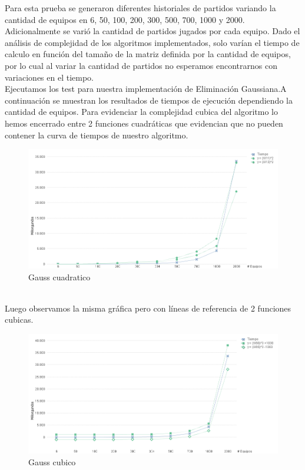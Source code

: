 Para esta prueba se generaron diferentes historiales de partidos variando la cantidad de equipos en 6, 50, 100, 200, 300, 500, 700, 1000 y 2000. \\

Adicionalmente se varió la cantidad de partidos jugados por cada equipo. Dado el análisis de complejidad de los algoritmos implementados, solo varían el tiempo de calculo en
función del tamaño de la matriz definida por la cantidad de equipos, por lo cual al variar la cantidad de partidos no esperamos encontrarnos con variaciones en el tiempo. \\

Ejecutamos los test para nuestra implementación de Eliminación Gaussiana.A continuación se muestran los resultados de tiempos de ejecución dependiendo la cantidad de equipos.
Para evidenciar la complejidad cubica del algoritmo lo hemos encerrado entre 2 funciones cuadráticas que evidencian que no pueden contener la curva de tiempos de nuestro algoritmo. \\

\begin{figure}[H]
    \centering
    \includegraphics[width=1\textwidth]{IMG/gauss cuadrativo.png}
    \caption{Gauss cuadratico}
    \label{fig:Gauss cuadratico}
\end{figure}

\\

Luego observamos la misma gráfica pero con líneas de referencia de 2 funciones cubicas. \\

\begin{figure}[H]
    \centering
    \includegraphics[width=1\textwidth]{IMG/gauss cubico.png}
    \caption{Gauss cubico}
    \label{fig:Gauss cubico}
\end{figure}

